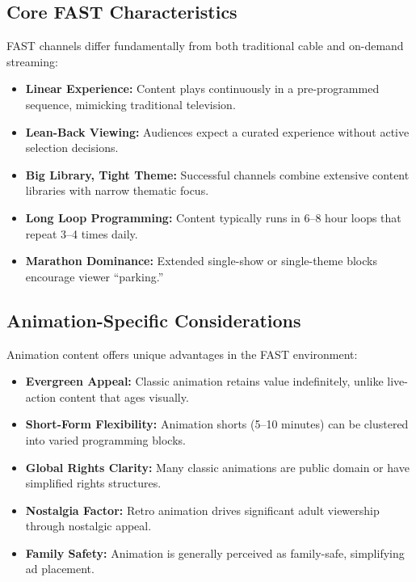 \documentclass[12pt,letterpaper,twoside]{report}
\begin{document}
\subsection{Core FAST Characteristics}

FAST channels differ fundamentally from both traditional cable and on-demand streaming:

\begin{itemize}[leftmargin=1.5cm]
    \item \textbf{Linear Experience:} Content plays continuously in a pre-programmed sequence, mimicking traditional television.
    \item \textbf{Lean-Back Viewing:} Audiences expect a curated experience without active selection decisions.
    \item \textbf{Big Library, Tight Theme:} Successful channels combine extensive content libraries with narrow thematic focus.
    \item \textbf{Long Loop Programming:} Content typically runs in 6--8 hour loops that repeat 3--4 times daily.
    \item \textbf{Marathon Dominance:} Extended single-show or single-theme blocks encourage viewer ``parking.''
\end{itemize}

\subsection{Animation-Specific Considerations}

Animation content offers unique advantages in the FAST environment:

\begin{itemize}[leftmargin=1.5cm]
    \item \textbf{Evergreen Appeal:} Classic animation retains value indefinitely, unlike live-action content that ages visually.
    \item \textbf{Short-Form Flexibility:} Animation shorts (5--10 minutes) can be clustered into varied programming blocks.
    \item \textbf{Global Rights Clarity:} Many classic animations are public domain or have simplified rights structures.
    \item \textbf{Nostalgia Factor:} Retro animation drives significant adult viewership through nostalgic appeal.
    \item \textbf{Family Safety:} Animation is generally perceived as family-safe, simplifying ad placement.
\end{itemize}
\end{document}
